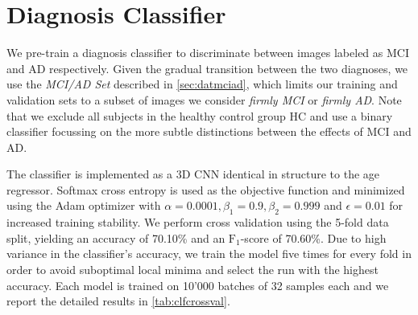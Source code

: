 \section{Diagnosis Classifier}
\label{sec:expdxclf}
We pre-train a diagnosis classifier to discriminate between images labeled as MCI and AD respectively. Given the gradual transition between the two diagnoses, we use the \textit{MCI/AD Set} described in \autoref{sec:datmciad}, which limits our training and validation sets to a subset of images we consider \textit{firmly MCI} or \textit{firmly AD}. Note that we exclude all subjects in the healthy control group HC and use a binary classifier focussing on the more subtle distinctions between the effects of MCI and AD.

The classifier is implemented as a 3D CNN identical in structure to the age regressor. Softmax cross entropy is used as the objective function and minimized using the Adam optimizer with $\alpha = 0.0001, \beta_1 = 0.9, \beta_2 = 0.999$ and $\epsilon = 0.01$ for increased training stability.
We perform cross validation using the 5-fold data split, yielding an accuracy of 70.10\% and an $\text{F}_1$-score of 70.60\%. Due to high variance in the classifier's accuracy, we train the model five times for every fold in order to avoid suboptimal local minima and select the run with the highest accuracy. Each model is trained on 10'000 batches of 32 samples each and we report the detailed results in \autoref{tab:clfcrossval}.

